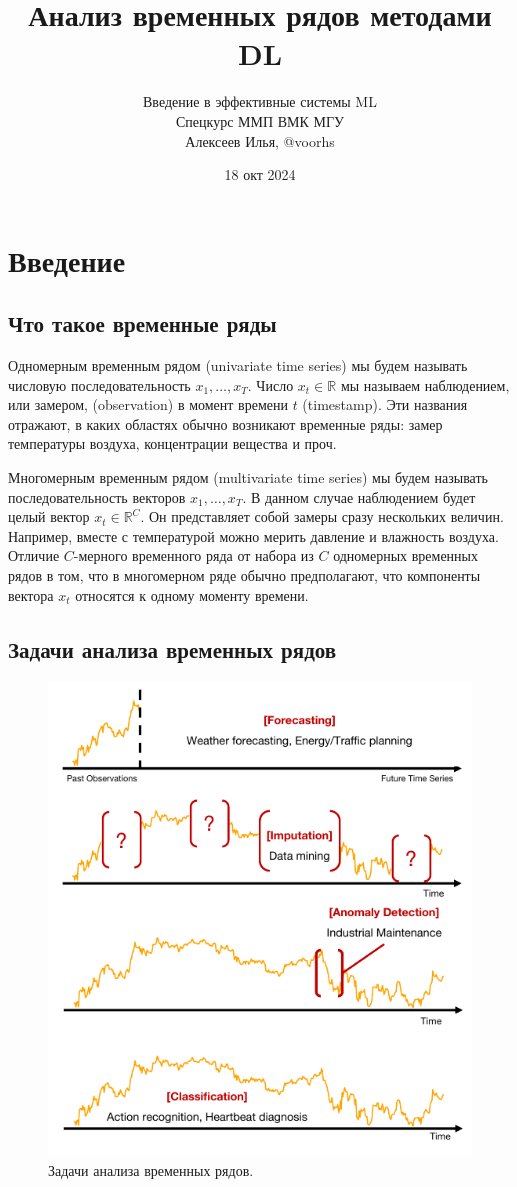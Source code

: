 \documentclass[12pt,fleqn]{article}
\newcommand{\R}{\mathbb{R}}
\begin{document}
\title{Анализ временных рядов методами DL}
\author{Введение в эффективные системы ML\\Спецкурс ММП ВМК МГУ\\Алексеев Илья, @voorhs}
\date{18 окт 2024}
\maketitle

\section{Введение}

\subsection{Что такое временные ряды}

Одномерным временным рядом (univariate time series) мы будем называть числовую последовательность $x_1,\ldots,x_T$. Число $x_t\in\R$ мы называем наблюдением, или замером, (observation) в момент времени $t$ (timestamp). Эти названия отражают, в каких областях обычно возникают временные ряды: замер температуры воздуха, концентрации вещества и проч.

Многомерным временным рядом (multivariate time series) мы будем называть последовательность векторов $x_1,\ldots,x_T$. В данном случае наблюдением будет целый вектор $x_t\in\R^C$. Он представляет собой замеры сразу нескольких величин. Например, вместе с температурой можно мерить давление и влажность воздуха. Отличие $C$-мерного временного ряда от набора из $C$ одномерных временных рядов в том, что в многомерном ряде обычно предполагают, что компоненты вектора $x_t$ относятся к одному моменту времени.

\subsection{Задачи анализа временных рядов}

\begin{figure}[!htb]
    \centering
    \includegraphics[width=0.5\linewidth]{LaTeX/images/tasks.pdf}
    \caption{Задачи анализа временных рядов.}
    \label{fig:tasks}
\end{figure}
\end{document}
